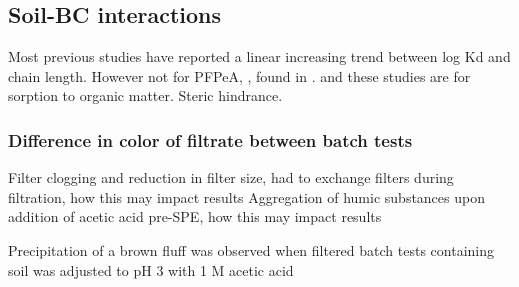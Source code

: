 \subsection{Soil-BC interactions}
Most previous studies have reported a linear increasing trend between log Kd and chain length. However not for PFPeA, \citep{zhang2013sorption}, found in \citep{Sorengard2019}. and \citep{guelfo2013}  these studies are for sorption to organic matter.  Steric hindrance. 

\subsubsection{Difference in color of filtrate between batch tests}
Filter clogging and reduction in filter size, had to exchange filters during filtration, how this may impact results
Aggregation of humic substances upon addition of acetic acid pre-SPE, how this may impact results

Precipitation of a brown fluff was observed when filtered batch tests containing soil was adjusted to pH 3 with 1 M acetic acid


